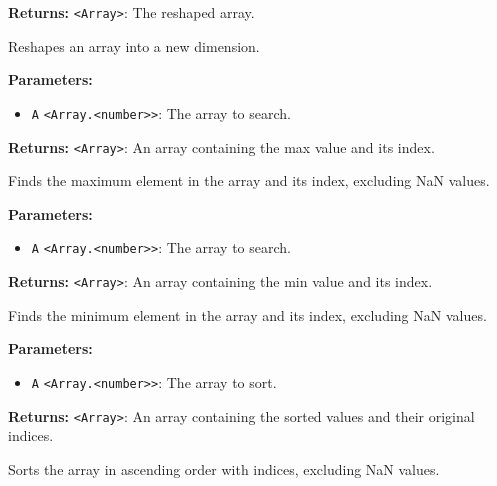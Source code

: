 \documentclass[12pt,a4paper]{article}
\begin{document}
\noindent \textbf{Returns:} \texttt{<Array>}: The reshaped array.

\noindent Reshapes an array into a new dimension.

\vspace{5mm}
\noindent {}


\noindent \textbf{Parameters:}
\begin{itemize}
  \item \texttt{A} \texttt{<Array.<number>>}: The array to search.
\end{itemize}

\noindent \textbf{Returns:} \texttt{<Array>}: An array containing the max value and its index.

\noindent Finds the maximum element in the array and its index, excluding NaN values.

\vspace{5mm}
\noindent {}


\noindent \textbf{Parameters:}
\begin{itemize}
  \item \texttt{A} \texttt{<Array.<number>>}: The array to search.
\end{itemize}

\noindent \textbf{Returns:} \texttt{<Array>}: An array containing the min value and its index.

\noindent Finds the minimum element in the array and its index, excluding NaN values.

\vspace{5mm}
\noindent {}


\noindent \textbf{Parameters:}
\begin{itemize}
  \item \texttt{A} \texttt{<Array.<number>>}: The array to sort.
\end{itemize}

\noindent \textbf{Returns:} \texttt{<Array>}: An array containing the sorted values and their original indices.

\noindent Sorts the array in ascending order with indices, excluding NaN values.
\end{document}

